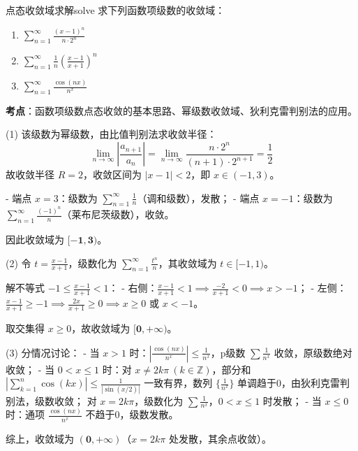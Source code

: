 \documentclass[UTF8,zihao=-4,openany]{ctexbook}
\begin{document}
\begin{example}{点态收敛域求解}{solve}
求下列函数项级数的收敛域：
\begin{enumerate}
  \item $\displaystyle \sum_{n=1}^{\infty} \frac{(x-1)^n}{n \cdot 2^n}$
  \item $\displaystyle \sum_{n=1}^{\infty} \frac{1}{n} \left( \frac{x-1}{x+1} \right)^n$
  \item $\displaystyle \sum_{n=1}^{\infty} \frac{\cos(nx)}{n^x}$
\end{enumerate}

\smallskip
\noindent \textbf{考点}：函数项级数点态收敛的基本思路、幂级数收敛域、狄利克雷判别法的应用。

(1) 该级数为幂级数，由比值判别法求收敛半径：
$$
\lim_{n \to \infty} \left| \frac{a_{n+1}}{a_n} \right| = \lim_{n \to \infty} \frac{n \cdot 2^n}{(n+1) \cdot 2^{n+1}} = \frac{1}{2}
$$
故收敛半径 $R=2$，收敛区间为 $|x-1|<2$，即 $x \in (-1,3)$。

- 端点 $x=3$：级数为 $\sum_{n=1}^\infty \frac{1}{n}$（调和级数），发散；
- 端点 $x=-1$：级数为 $\sum_{n=1}^\infty \frac{(-1)^n}{n}$（莱布尼茨级数），收敛。

因此收敛域为 $\boldsymbol{[-1, 3)}$。

\medskip
(2) 令 $t = \frac{x-1}{x+1}$，级数化为 $\sum_{n=1}^\infty \frac{t^n}{n}$，其收敛域为 $t \in [-1,1)$。

解不等式 $-1 \leq \frac{x-1}{x+1} < 1$：
- 右侧：$\frac{x-1}{x+1} < 1 \implies \frac{-2}{x+1} < 0 \implies x > -1$；
- 左侧：$\frac{x-1}{x+1} \geq -1 \implies \frac{2x}{x+1} \geq 0 \implies x \geq 0 \text{ 或 } x < -1$。

取交集得 $x \geq 0$，故收敛域为 $\boldsymbol{[0, +\infty)}$。

\medskip
(3) 分情况讨论：
- 当 $x > 1$ 时：$\left| \frac{\cos(nx)}{n^x} \right| \leq \frac{1}{n^x}$，p级数 $\sum \frac{1}{n^x}$ 收敛，原级数绝对收敛；
- 当 $0 < x \leq 1$ 时：对 $x \neq 2k\pi\ (k \in \mathbb{Z})$，部分和 $\left| \sum_{k=1}^n \cos(kx) \right| \leq \frac{1}{|\sin(x/2)|}$ 一致有界，数列 $\{\frac{1}{n^x}\}$ 单调趋于0，由狄利克雷判别法，级数收敛；
  对 $x = 2k\pi$，级数化为 $\sum \frac{1}{n^x}$，$0<x\leq1$ 时发散；
- 当 $x \leq 0$ 时：通项 $\frac{\cos(nx)}{n^x}$ 不趋于0，级数发散。

综上，收敛域为 $\boldsymbol{(0, +\infty)}$（$x=2k\pi$ 处发散，其余点收敛）。


\end{example}
\end{document}
